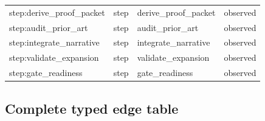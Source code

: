 \documentclass[10pt,a4paper]{article}
\begin{document}
\begin{longtable}{@{}>{\raggedright\arraybackslash}p{.22\linewidth}>{\raggedright\arraybackslash}p{.10\linewidth}>{\raggedright\arraybackslash}p{.38\linewidth}>{\raggedright\arraybackslash}p{.12\linewidth}@{}}
step:\allowbreak{}derive\_\allowbreak{}proof\_\allowbreak{}packet & step & derive\_\allowbreak{}proof\_\allowbreak{}packet & observed\\
step:\allowbreak{}audit\_\allowbreak{}prior\_\allowbreak{}art & step & audit\_\allowbreak{}prior\_\allowbreak{}art & observed\\
step:\allowbreak{}integrate\_\allowbreak{}narrative & step & integrate\_\allowbreak{}narrative & observed\\
step:\allowbreak{}validate\_\allowbreak{}expansion & step & validate\_\allowbreak{}expansion & observed\\
step:\allowbreak{}gate\_\allowbreak{}readiness & step & gate\_\allowbreak{}readiness & observed\\
\bottomrule
\end{longtable}
\normalsize\endgroup
\subsection{Complete typed edge table}
\begingroup\setlength{\tabcolsep}{2pt}\small
\end{document}
